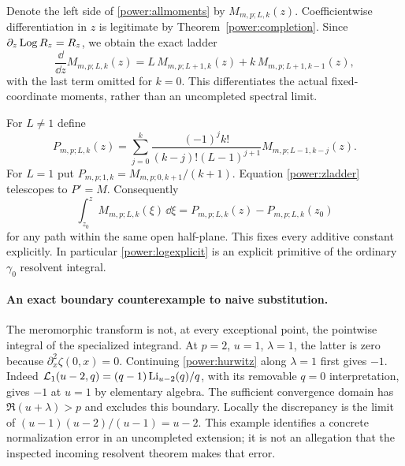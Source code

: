 Denote the left side of \eqref{power:allmoments} by
$M_{m,p;L,k}(z)$.  Coefficientwise differentiation in $z$ is legitimate
by Theorem~\ref{power:completion}.  Since
$\partial_z\operatorname{Log} R_z=R_z$, we obtain the exact ladder
\begin{equation}\label{power:zladder}
 \frac{\dd}{\dd z}M_{m,p;L,k}(z)
    =L\,M_{m,p;L+1,k}(z)+k\,M_{m,p;L+1,k-1}(z),
\end{equation}
with the last term omitted for $k=0$.  This differentiates the actual
fixed-coordinate moments, rather than an uncompleted spectral limit.

For $L\ne1$ define
\begin{equation}\label{power:primitive}
 P_{m,p;L,k}(z)=
 \sum_{j=0}^k\frac{(-1)^jk!}{(k-j)!(L-1)^{j+1}}
                         M_{m,p;L-1,k-j}(z).
\end{equation}
For $L=1$ put $P_{m,p;1,k}=M_{m,p;0,k+1}/(k+1)$.
Equation \eqref{power:zladder} telescopes to $P'=M$.
Consequently
\begin{equation}\label{power:normalizedprimitive}
 \int_{z_0}^{z}M_{m,p;L,k}(\xi)\,\dd\xi
       =P_{m,p;L,k}(z)-P_{m,p;L,k}(z_0)
\end{equation}
for any path within the same open half-plane.  This fixes every additive
constant explicitly.  In particular \eqref{power:logexplicit} is an
explicit primitive of the ordinary $\gamma_0$ resolvent integral.

\paragraph{An exact boundary counterexample to naive substitution.}
The meromorphic transform is not, at every exceptional point, the
pointwise integral of the specialized integrand.  At $p=2$, $u=1$,
$\lambda=1$, the latter is zero because
$\partial_x^2\zeta(0,x)=0$.  Continuing \eqref{power:hurwitz} along
$\lambda=1$ first gives $-1$.  Indeed
$\mathcal L_1(u-2,q)=(q-1)\operatorname{Li}_{u-2}(q)/q$, with its removable
$q=0$ interpretation, gives $-1$ at $u=1$ by elementary algebra.
The sufficient convergence domain has $\Re(u+\lambda)>p$ and
excludes this boundary.  Locally the discrepancy is the limit of
$(u-1)(u-2)/(u-1)=u-2$.  This example identifies a concrete
normalization error in an uncompleted extension; it is not an allegation
that the inspected incoming resolvent theorem makes that error.
